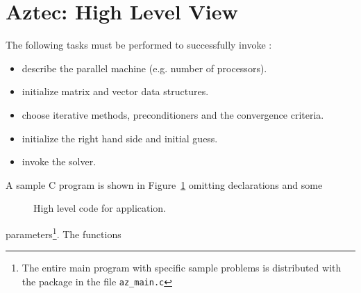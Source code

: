 \section{{\protect \bf Aztec}: High Level View\label{highlevel}}

The following tasks must be performed to successfully
invoke \Az{}:
\begin{itemize}
\item describe the parallel machine (e.g. number of processors).
\item initialize matrix and vector data structures.
\item choose iterative methods, preconditioners and the convergence criteria.
\item initialize the right hand side and initial guess.
\item invoke the solver.
\end{itemize}
A sample C program is shown in Figure~\ref{highlevel_code} omitting
declarations and some
%
\begin{figure}[Htbp]
  \caption{High level code for \Az{} application.}\label{highlevel_code}
\end{figure}
%
parameters\footnote{The entire main program with specific sample problems is
  distributed with the package in the file \tt az\_main.c}. The functions
